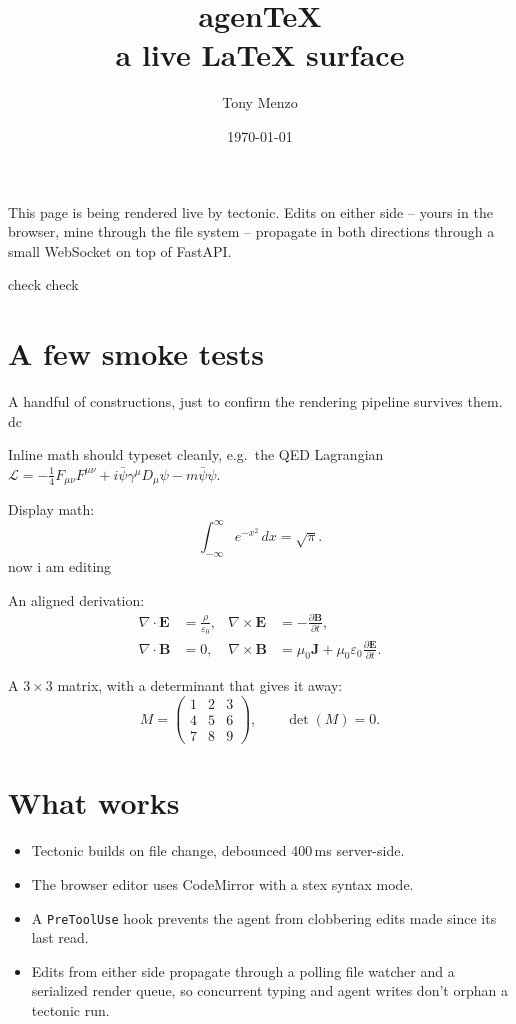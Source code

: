 \documentclass[11pt]{article}
\title{agen\TeX \\[0.1in] \large a live LaTeX surface}
\author{Tony Menzo}
\date{\today}
\begin{document}
\maketitle

\noindent
This page is being rendered live by tectonic. Edits on either side --
yours in the browser, mine through the file system -- propagate in both
directions through a small WebSocket on top of FastAPI.

check check

\section*{A few smoke tests}

A handful of constructions, just to confirm the rendering pipeline survives them. dc

Inline math should typeset cleanly, e.g.\ the QED Lagrangian
$\mathcal{L} = -\tfrac{1}{4} F_{\mu\nu} F^{\mu\nu} + i\bar\psi\gamma^\mu D_\mu \psi - m\bar\psi\psi$.

Display math:
\[
  \int_{-\infty}^{\infty} e^{-x^2}\, dx = \sqrt{\pi}.
\]
now i am editing

An aligned derivation:
\begin{align*}
  \nabla \cdot \mathbf{E} &= \frac{\rho}{\varepsilon_0}, &
  \nabla \times \mathbf{E} &= -\frac{\partial \mathbf{B}}{\partial t}, \\
  \nabla \cdot \mathbf{B} &= 0, &
  \nabla \times \mathbf{B} &= \mu_0 \mathbf{J} + \mu_0 \varepsilon_0 \frac{\partial \mathbf{E}}{\partial t}.
\end{align*}


A $3\times 3$ matrix, with a determinant that gives it away:
\[
  M = \begin{pmatrix}
    1 & 2 & 3 \\
    4 & 5 & 6 \\
    7 & 8 & 9
  \end{pmatrix},
  \qquad
  \det(M) = 0.
\]
\section*{What works}

\begin{itemize}
  \item Tectonic builds on file change, debounced 400\,ms server-side.
  \item The browser editor uses CodeMirror with a stex syntax mode.
  \item A \texttt{PreToolUse} hook prevents the agent from clobbering
        edits made since its last read.
  \item Edits from either side propagate through a polling file watcher
        and a serialized render queue, so concurrent typing and agent
        writes don't orphan a tectonic run.
\end{itemize}
\end{document}
